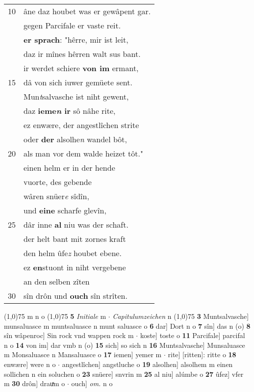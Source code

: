 \documentclass[8pt,a4paper,notitlepage]{article}
\begin{document}
\begin{table}[ht]
\begin{minipage}[t]{0.5\linewidth}
\begin{tabular}{rl}
10 & âne daz houbet was er gewâpent gar.\\ 
 & gegen Parcifale er vaste reit.\\ 
 & \textbf{er sprach}: "hêrre, mir ist leit,\\ 
 & daz ir mînes hêrren walt sus bant.\\ 
 & ir werdet schiere \textbf{von im} ermant,\\ 
15 & dâ von sich iuwer gemüete sent.\\ 
 & Mun\textit{t}salvasche ist niht gewent,\\ 
 & daz \textbf{ieme\textit{n} ir} sô nâhe rite,\\ 
 & ez enwære, der angestlîchen strite\\ 
 & oder \textbf{der} alsolhe\textit{n} wandel bôt,\\ 
20 & als man vor dem walde heizet tôt."\\ 
 & einen helm er in der hende\\ 
 & vuorte, des gebende\\ 
 & wâren snüer\textit{e} sîdîn,\\ 
 & und \textbf{eine} scharfe glevîn,\\ 
25 & dâr inne \textbf{al} niu was der schaft.\\ 
 & der helt bant mit zornes kraft\\ 
 & den helm ûfe\textit{z} houbet ebene.\\ 
 & ez \textbf{en}stuont in niht vergebene\\ 
 & an den selben zîten\\ 
30 & sîn drôn und \textbf{ouch} sîn strîten.\\ 
\end{tabular}
\scriptsize
\line(1,0){75} \newline
m n o \newline
\line(1,0){75} \newline
\textbf{5} \textit{Initiale} m   $\cdot$ \textit{Capitulumzeichen} n  \newline
\line(1,0){75} \newline
\textbf{3} Muntsalvasche] munsaluasce m muntsaluasce n munt saluasce o \textbf{6} dar] Dort n o \textbf{7} sîn] das n (o) \textbf{8} sîn wâpenroc] Sin rock vnd wappen rock m  $\cdot$ koste] toste o \textbf{11} Parcifale] parcifal n o \textbf{14} von im] dar vmb n (o) \textbf{15} sich] so sich n \textbf{16} Muntsalvasche] Munsaluasce m Monsaluasce n Mansaluasce o \textbf{17} iemen] yemer m  $\cdot$ rite] [ritten]: ritte o \textbf{18} enwære] were n o  $\cdot$ angestlîchen] angstluche o \textbf{19} alsolhen] alsolhem m einen sollichen n ein soluchen o \textbf{23} snüere] snvrin m \textbf{25} al niu] alúmbe o \textbf{27} ûfez] vfer m \textbf{30} drôn] drauͯm o  $\cdot$ ouch] \textit{om.} n o \newline
\end{minipage}
\end{table}
\end{document}
